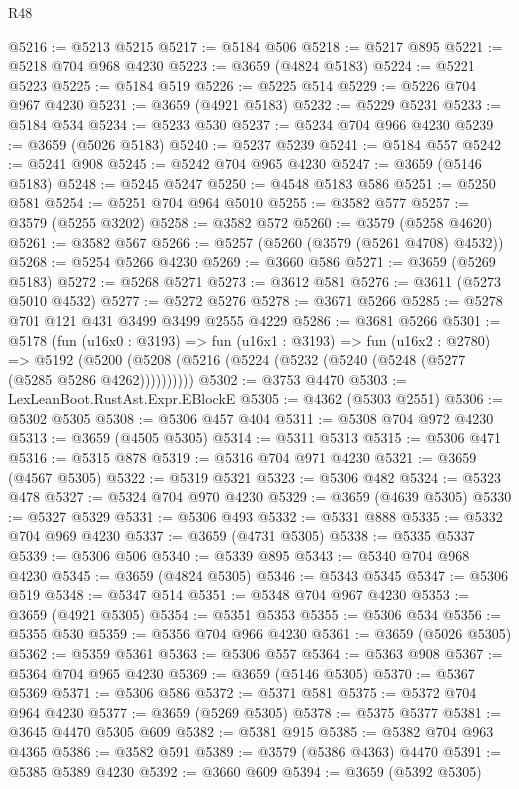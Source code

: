 \begin{lexlean}{R48}
\begin{coremodule}
@5216 := @5213 @5215
@5217 := @5184 @506
@5218 := @5217 @895
@5221 := @5218 @704 @968 @4230
@5223 := @3659 (@4824 @5183)
@5224 := @5221 @5223
@5225 := @5184 @519
@5226 := @5225 @514
@5229 := @5226 @704 @967 @4230
@5231 := @3659 (@4921 @5183)
@5232 := @5229 @5231
@5233 := @5184 @534
@5234 := @5233 @530
@5237 := @5234 @704 @966 @4230
@5239 := @3659 (@5026 @5183)
@5240 := @5237 @5239
@5241 := @5184 @557
@5242 := @5241 @908
@5245 := @5242 @704 @965 @4230
@5247 := @3659 (@5146 @5183)
@5248 := @5245 @5247
@5250 := @4548 @5183 @586
@5251 := @5250 @581
@5254 := @5251 @704 @964 @5010
@5255 := @3582 @577
@5257 := @3579 (@5255 @3202)
@5258 := @3582 @572
@5260 := @3579 (@5258 @4620)
@5261 := @3582 @567
@5266 := @5257 (@5260 (@3579 (@5261 @4708) @4532))
@5268 := @5254 @5266 @4230
@5269 := @3660 @586
@5271 := @3659 (@5269 @5183)
@5272 := @5268 @5271
@5273 := @3612 @581
@5276 := @3611 (@5273 @5010 @4532)
@5277 := @5272 @5276
@5278 := @3671 @5266
@5285 := @5278 @701 @121 @431 @3499 @3499 @2555 @4229
@5286 := @3681 @5266
@5301 := @5178
    (fun (u16x0 : @3193) =>
    fun (u16x1 : @3193) =>
    fun (u16x2 : @2780) =>
    @5192 (@5200 (@5208 (@5216 (@5224 (@5232 (@5240 (@5248 (@5277 (@5285 @5286 @4262))))))))))
@5302 := @3753 @4470
@5303 := LexLeanBoot.RustAst.Expr.EBlockE
@5305 := @4362 (@5303 @2551)
@5306 := @5302 @5305
@5308 := @5306 @457 @404
@5311 := @5308 @704 @972 @4230
@5313 := @3659 (@4505 @5305)
@5314 := @5311 @5313
@5315 := @5306 @471
@5316 := @5315 @878
@5319 := @5316 @704 @971 @4230
@5321 := @3659 (@4567 @5305)
@5322 := @5319 @5321
@5323 := @5306 @482
@5324 := @5323 @478
@5327 := @5324 @704 @970 @4230
@5329 := @3659 (@4639 @5305)
@5330 := @5327 @5329
@5331 := @5306 @493
@5332 := @5331 @888
@5335 := @5332 @704 @969 @4230
@5337 := @3659 (@4731 @5305)
@5338 := @5335 @5337
@5339 := @5306 @506
@5340 := @5339 @895
@5343 := @5340 @704 @968 @4230
@5345 := @3659 (@4824 @5305)
@5346 := @5343 @5345
@5347 := @5306 @519
@5348 := @5347 @514
@5351 := @5348 @704 @967 @4230
@5353 := @3659 (@4921 @5305)
@5354 := @5351 @5353
@5355 := @5306 @534
@5356 := @5355 @530
@5359 := @5356 @704 @966 @4230
@5361 := @3659 (@5026 @5305)
@5362 := @5359 @5361
@5363 := @5306 @557
@5364 := @5363 @908
@5367 := @5364 @704 @965 @4230
@5369 := @3659 (@5146 @5305)
@5370 := @5367 @5369
@5371 := @5306 @586
@5372 := @5371 @581
@5375 := @5372 @704 @964 @4230
@5377 := @3659 (@5269 @5305)
@5378 := @5375 @5377
@5381 := @3645 @4470 @5305 @609
@5382 := @5381 @915
@5385 := @5382 @704 @963 @4365
@5386 := @3582 @591
@5389 := @3579 (@5386 @4363) @4470
@5391 := @5385 @5389 @4230
@5392 := @3660 @609
@5394 := @3659 (@5392 @5305)

\end{coremodule}
\end{lexlean}
